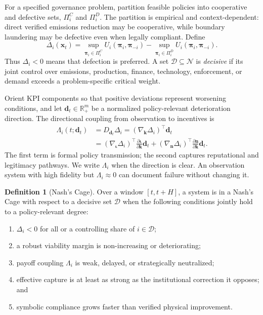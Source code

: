 \documentclass[11pt,a4paper]{article}
\numberwithin{equation}{section}
\theoremstyle{definition}
\newtheorem{definition}{Definition}[section]
\theoremstyle{plain}
\theoremstyle{remark}
\newcommand{\R}{\mathbb{R}}
\newcommand{\policy}{\boldsymbol{\pi}}
\newcommand{\state}{\bm{x}}
\newcommand{\kpi}{\bm{k}}
\newcommand{\inst}{\bm{\iota}}
\newcommand{\narr}{\bm{n}}
\begin{document}
For a specified governance problem, partition feasible policies into cooperative and defective sets, $\Pi_i^C$ and $\Pi_i^D$. The partition is empirical and context-dependent: direct verified emissions reduction may be cooperative, while boundary laundering may be defective even when legally compliant. Define
\begin{equation}
\Delta_i(\state_t)=
\sup_{\policy_i\in\Pi_i^C}U_i(\policy_i,\policy_{-i})
-
\sup_{\policy_i\in\Pi_i^D}U_i(\policy_i,\policy_{-i}).
\label{eq:payoffdiff}
\end{equation}
Thus $\Delta_i<0$ means that defection is preferred. A set $\mathcal D\subseteq\mathcal N$ is \emph{decisive} if its joint control over emissions, production, finance, technology, enforcement, or demand exceeds a problem-specific critical weight.

Orient KPI components so that positive deviations represent worsening conditions, and let $\bm d_t\in\R_+^m$ be a normalized policy-relevant deterioration direction. The directional coupling from observation to incentives is
\begin{align}
\Lambda_i(t;\bm d_t)
&=D_{\bm d_t}\Delta_i
=(\nabla_{\kpi}\Delta_i)^{\top}\bm d_t \\
&=(\nabla_{\inst}\Delta_i)^{\top}
\frac{\partial \inst}{\partial \kpi}\bm d_t
+ (\nabla_{\narr}\Delta_i)^{\top}
\frac{\partial \narr}{\partial \kpi}\bm d_t.
\label{eq:payoffcoupling}
\end{align}
The first term is formal policy transmission; the second captures reputational and legitimacy pathways. We write $\Lambda_i$ when the direction is clear. An observation system with high fidelity but $\Lambda_i\approx0$ can document failure without changing it.

\begin{definition}[Nash's Cage]
Over a window $[t,t+H]$, a system is in a Nash's Cage with respect to a decisive set $\mathcal D$ when the following conditions jointly hold to a policy-relevant degree:
\begin{enumerate}[label=(C\arabic*)]
  \item $\Delta_i<0$ for all or a controlling share of $i\in\mathcal D$;
  \item a robust viability margin is non-increasing or deteriorating;
  \item payoff coupling $\Lambda_i$ is weak, delayed, or strategically neutralized;
  \item effective capture is at least as strong as the institutional correction it opposes; and
  \item symbolic compliance grows faster than verified physical improvement.
\end{enumerate}
\end{definition}
\end{document}
